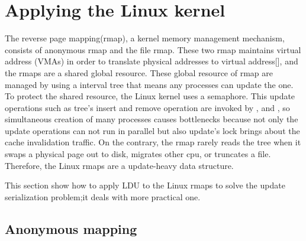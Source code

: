 \section{Applying the Linux kernel}



The reverse page mapping(rmap), a kernel memory management mechanism, consists
of anonymous rmap and the file rmap.
These two rmap maintains virtual address (VMAs) in order to translate physical
addresses to virtual address[], and the rmaps are a shared global resource.
These global resource of rmap are managed by using a interval tree that means
any processes can update the one.
To protect the shared resource, the Linux kernel uses a semaphore.
This update operations such as tree's insert and remove operation are invoked by
,  and , so simultaneous creation of many
processes causes bottlenecks because not only the update operations can not run
in parallel but also update's lock brings about the cache invalidation traffic.
On the contrary, the rmap rarely reads the tree when it swaps a physical page
out to disk, migrates other cpu, or truncates a file.
Therefore, the Linux rmaps are a update-heavy data structure. 

This section show how to apply LDU to the Linux rmaps to solve the update
serialization problem;it deals with more practical one.

\subsection{Anonymous mapping}


